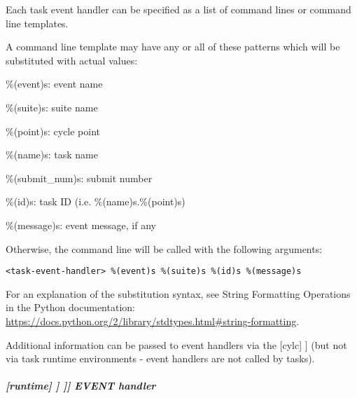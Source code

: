 Each task event handler can be specified as a list of command lines or command
line templates.

A command line template may have any or all of these patterns which will be
substituted with actual values:
\begin{myitemize}
    \item \%(event)s: event name
    \item \%(suite)s: suite name
    \item \%(point)s: cycle point
    \item \%(name)s: task name
    \item \%(submit\_num)s: submit number
    \item \%(id)s: task ID (i.e. \%(name)s.\%(point)s)
    \item \%(message)s: event message, if any
\end{myitemize}

Otherwise, the command line will be called with the following arguments:
\begin{lstlisting}
<task-event-handler> %(event)s %(suite)s %(id)s %(message)s
\end{lstlisting}

For an explanation of the substitution syntax, see String Formatting Operations
in the Python documentation:
\url{https://docs.python.org/2/library/stdtypes.html#string-formatting}.

Additional information can be passed to event handlers via the
[cylc] \textrightarrow [[environment]] (but not via task
runtime environments - event handlers are not called by tasks).

\subparagraph[EVENT handler]{[runtime] \textrightarrow [[\_\_NAME\_\_]] \textrightarrow [[[events]]] \textrightarrow EVENT handler}

